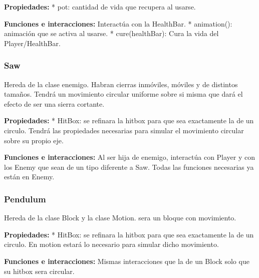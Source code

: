 \documentclass{article}
\begin{document}
\subitem \textbf{Propiedades:} \newline
* pot: cantidad de vida que recupera al usarse. \newline

\subitem \textbf{Funciones e interacciones:} \newline
Interactúa con la HealthBar.\newline
* animation(): animación que se activa al usarse. \newline
* cure(healthBar): Cura la vida del Player/HealthBar. \newline

\subsubsection*{Saw}
Hereda de la clase enemigo. Habran cierras inmóviles, móviles y de distintos tamaños. Tendrá un movimiento circular uniforme sobre si misma que dará el efecto de ser una sierra cortante.\newline 

\subitem \textbf{Propiedades:} \newline
* HitBox: se refinara la hitbox para que sea exactamente la de un circulo.\newline
Tendrá las propiedades necesarias para simular el movimiento circular sobre su propio eje.\newline

\subitem \textbf{Funciones e interacciones:} \newline
Al ser hija de enemigo, interactúa con Player y con los Enemy que sean de un tipo diferente a Saw. Todas las funciones necesarias ya están en Enemy.\newline

\subsubsection*{Pendulum}
Hereda de la clase Block y la clase Motion. sera un bloque con movimiento.\newline

\subitem \textbf{Propiedades:} \newline
* HitBox: se refinara la hitbox para que sea exactamente la de un circulo.\newline
En motion estará lo necesario para simular dicho movimiento.\newline
 
\subitem \textbf{Funciones e interacciones:} \newline
Mismas interacciones que la de un Block solo que su hitbox sera circular.
\end{document}
